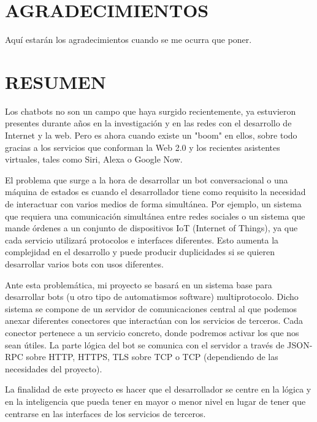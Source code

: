 \documentclass[spanish,12pt, a4paper, twoside]{paper}
\let\oldsection\section
\def\section{\cleardoublepage\oldsection}
\newcommand\blankpage{%
    \null
    \thispagestyle{empty}%
    \addtocounter{page}{-1}%
    \newpage}
\begin{document}
\afterpage{\blankpage}


\section*{AGRADECIMIENTOS}
Aquí estarán los agradecimientos cuando se me ocurra que poner.

\section*{RESUMEN}
Los chatbots no son un campo que haya surgido recientemente, ya estuvieron presentes durante años en la investigación y en las redes con el desarrollo de Internet y la web. Pero es ahora cuando existe un "boom" en ellos, sobre todo gracias a los servicios que conforman la Web 2.0 y los recientes asistentes virtuales, tales como Siri, Alexa o Google Now.
\newline

El problema que surge a la hora de desarrollar un bot conversacional o una máquina de estados es cuando el desarrollador tiene como requisito la necesidad de interactuar con varios medios de forma simultánea. Por ejemplo, un sistema que requiera una comunicación simultánea entre redes sociales o un sistema que mande órdenes a un conjunto de dispositivos IoT (Internet of Things), ya que cada servicio utilizará protocolos e interfaces diferentes. Esto aumenta la complejidad en el desarrollo y puede producir duplicidades si se quieren desarrollar varios bots con usos diferentes.
\newline

Ante esta problemática, mi proyecto se basará en un sistema base para desarrollar bots (u otro tipo de automatismos software) multiprotocolo. Dicho sistema se compone de un servidor de comunicaciones central al que podemos anexar diferentes conectores que interactúan con los servicios de terceros. Cada conector pertenece a un servicio concreto, donde podremos activar los que nos sean útiles. La parte lógica del bot se comunica con el servidor a través de JSON-RPC sobre HTTP, HTTPS, TLS sobre TCP o TCP (dependiendo de las necesidades del proyecto).
\newline

La finalidad de este proyecto es hacer que el desarrollador se centre en la lógica y en la inteligencia que pueda tener en mayor o menor nivel en lugar de tener que centrarse en las interfaces de los servicios de terceros.
\end{document}
